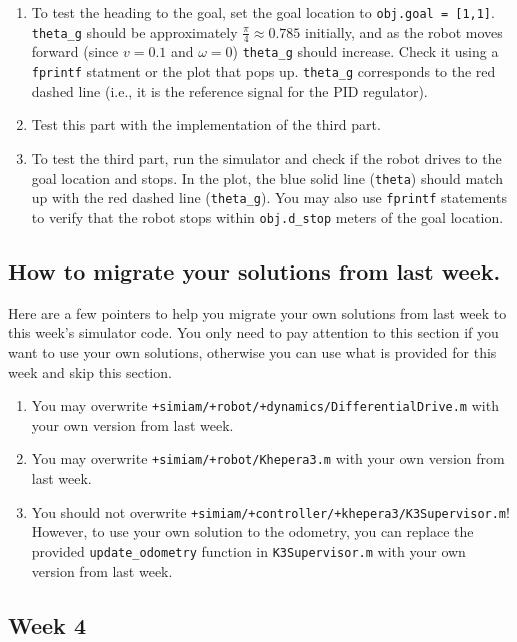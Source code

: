 \documentclass[10pt]{article}
\begin{document}
\begin{enumerate}
  \item To test the heading to the goal, set the goal location to \texttt{obj.goal = [1,1]}. \texttt{theta\_g} should be approximately $\frac{\pi}{4} \approx 0.785$ initially, and as the robot moves forward (since $v=0.1$ and $\omega=0$) \texttt{theta\_g} should increase. Check it using a \texttt{fprintf} statment or the plot that pops up. \texttt{theta\_g} corresponds to the red dashed line (i.e., it is the reference signal for the PID regulator).
  \item Test this part with the implementation of the third part.
  \item To test the third part, run the simulator and check if the robot drives to the goal location and stops. In the plot, the blue solid line (\texttt{theta}) should match up with the red dashed line (\texttt{theta\_g}). You may also use \texttt{fprintf} statements to verify that the robot stops within \texttt{obj.d\_stop} meters of the goal location.
\end{enumerate}

\subsection*{How to migrate your solutions from last week.}

Here are a few pointers to help you migrate your own solutions from last week to this week's simulator code. You only need to pay attention to this section if you want to use your own solutions, otherwise you can use what is provided for this week and skip this section.

\begin{enumerate}
 \item You may overwrite \texttt{+simiam/+robot/+dynamics/DifferentialDrive.m} with your own version from last week.
 \item You may overwrite \texttt{+simiam/+robot/Khepera3.m} with your own version from last week.
 \item You should not overwrite \texttt{+simiam/+controller/+khepera3/K3Supervisor.m}! However, to use your own solution to the odometry, you can replace the provided \texttt{update\_odometry} function in \texttt{K3Supervisor.m} with your own version from last week.
\end{enumerate}

\subsection{Week 4}
\end{document}
